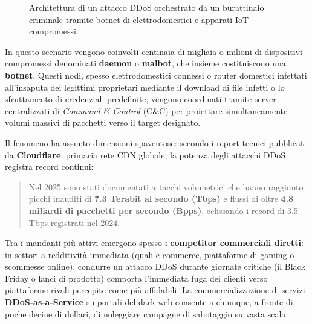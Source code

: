 \documentclass[../../main.tex]{subfiles}
\begin{document}
\begin{figure}[htbp]
{%
}
\caption{Architettura di un attacco DDoS orchestrato da un burattinaio criminale tramite botnet di elettrodomestici e apparati IoT compromessi.}
\label{fig:botnet_ddos}
\end{figure}

In questo scenario vengono coinvolti centinaia di migliaia o milioni di dispositivi compromessi denominati \textbf{daemon} o \textbf{malbot}, che insieme costituiscono una \textbf{botnet}. Questi nodi, spesso elettrodomestici connessi o router domestici infettati all'insaputa dei legittimi proprietari mediante il download di file infetti o lo sfruttamento di credenziali predefinite, vengono coordinati tramite server centralizzati di \textit{Command \& Control} (C\&C) per proiettare simultaneamente volumi massivi di pacchetti verso il target designato.

Il fenomeno ha assunto dimensioni spaventose: secondo i report tecnici pubblicati da \textbf{Cloudflare}, primaria rete CDN globale, la potenza degli attacchi DDoS registra record continui:
\begin{quote}
Nel 2025 sono stati documentati attacchi volumetrici che hanno raggiunto picchi inauditi di \textbf{7.3 Terabit al secondo (Tbps)} e flussi di oltre \textbf{4.8 miliardi di pacchetti per secondo (Bpps)}, eclissando i record di 3.5 Tbps registrati nel 2024.
\end{quote}
Tra i mandanti più attivi emergono spesso i \textbf{competitor commerciali diretti}: in settori a redditività immediata (quali e-commerce, piattaforme di gaming o scommesse online), condurre un attacco DDoS durante giornate critiche (il Black Friday o lanci di prodotto) comporta l'immediata fuga dei clienti verso piattaforme rivali percepite come più affidabili. La commercializzazione di servizi \textbf{DDoS-as-a-Service} su portali del dark web consente a chiunque, a fronte di poche decine di dollari, di noleggiare campagne di sabotaggio su vasta scala.
\end{document}
